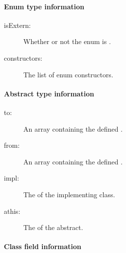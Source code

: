 \paragraph{Enum type information}

\begin{description}
	\item[isExtern:] Whether or not the enum is .
	\item[constructors:] The list of enum constructors.
\end{description}

\paragraph{Abstract type information}

\begin{description}
	\item[to:] An array containing the defined .
	\item[from:] An array containing the defined .
	\item[impl:] The  of the implementing class.
	\item[athis:] The  of the abstract.
\end{description}
	
	
\paragraph{Class field information}
\label{cr-rtti-class-field-information}

